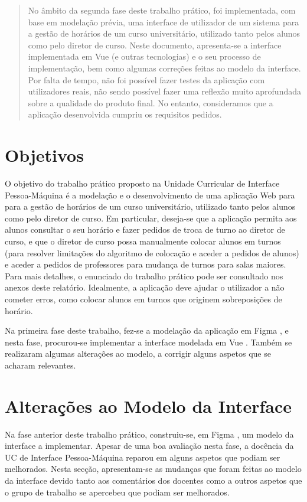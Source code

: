 \documentclass[12pt, a4paper]{article}
\begin{document}
\begin{abstract}
    \noindent
    No âmbito da segunda fase deste trabalho prático, foi implementada, com base em modelação
    prévia, uma interface de utilizador de um sistema para a gestão de horários de um curso
    universitário, utilizado tanto pelos alunos como pelo diretor de curso. Neste documento,
    apresenta-se a interface implementada em Vue \cite{vue} (e outras tecnologias) e o seu processo
    de implementação, bem como algumas correções feitas ao modelo da interface. Por falta de tempo,
    não foi possível fazer testes da aplicação com utilizadores reais, não sendo possível fazer uma
    reflexão muito aprofundada sobre a qualidade do produto final. No entanto, consideramos que a
    aplicação desenvolvida cumpriu os requisitos pedidos.
\end{abstract}

\section{Objetivos}

O objetivo do trabalho prático proposto na Unidade Curricular de Interface Pessoa-Máquina é a
modelação e o desenvolvimento de uma aplicação Web para para a gestão de horários de um curso
universitário, utilizado tanto pelos alunos como pelo diretor de curso. Em particular, deseja-se que
a aplicação permita aos alunos consultar o seu horário e fazer pedidos de troca de turno ao diretor
de curso, e que o diretor de curso possa manualmente colocar alunos em turnos (para resolver
limitações do algoritmo de colocação e aceder a pedidos de alunos) e aceder a pedidos de professores
para mudança de turnos para salas maiores. Para mais detalhes, o enunciado do trabalho prático pode
ser consultado nos anexos deste relatório. Idealmente, a aplicação deve ajudar o utilizador a não
cometer erros, como colocar alunos em turnos que originem sobreposições de horário.

Na primeira fase deste trabalho, fez-se a modelação da aplicação em Figma \cite{figma}, e nesta
fase, procurou-se implementar a interface modelada em Vue \cite{vue}. Também se realizaram algumas
alterações ao modelo, a corrigir alguns aspetos que se acharam relevantes.

\section{Alterações ao Modelo da Interface}

Na fase anterior deste trabalho prático, construiu-se, em Figma \cite{figma}, um modelo da interface
a implementar. Apesar de uma boa avaliação nesta fase, a docência da UC de Interface Pessoa-Máquina
reparou em alguns aspetos que podiam ser melhorados. Nesta secção, apresentam-se as mudanças que
foram feitas ao modelo da interface devido tanto aos comentários dos docentes como a outros aspetos
que o grupo de trabalho se apercebeu que podiam ser melhorados.
\end{document}
